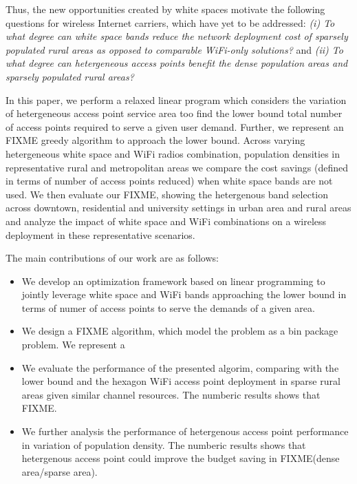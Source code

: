 Thus, the new opportunities created by white spaces motivate the following 
questions for wireless Internet carriers, which have yet to be addressed: 
{\it (i) To what degree can white space bands reduce the network deployment cost of
sparsely populated rural areas as opposed to comparable WiFi-only solutions?} and 
{\it (ii) To what degree can hetergeneous access points benefit the dense 
population areas and sparsely populated rural areas?}

In this paper, we perform a relaxed linear program which considers the 
variation of hetergeneous access point service area too find the lower bound
total number of access points required to serve a given user demand. Further,
we represent an FIXME greedy algorithm to approach the lower bound.  
Across varying hetergeneous white space and WiFi radios combination, population 
densities in representative rural and metropolitan areas we compare the 
cost savings (defined in terms of number of access points reduced) when 
white space bands are not used. We then evaluate our FIXME, showing
the hetergenous band selection across downtown, residential and university settings in
urban area and rural areas and analyze the impact of white space and WiFi
combinations on a wireless deployment in these representative scenarios.

The main contributions of our work are as follows:
\begin{itemize}
\item We develop an optimization framework based on linear programming to jointly leverage white space and WiFi 
bands approaching the lower bound in terms of numer of access points to serve the demands of a given area.
\item We design a FIXME algorithm, which model the problem as a bin package problem. We represent a 
\item We evaluate the performance of the presented algorim, comparing with the lower bound and the hexagon
WiFi access point deployment in sparse rural areas given similar channel resources. The numberic results shows that FIXME.  
\item We further analysis the performance of hetergenous access point performance in variation of population density. The
numberic results shows that hetergenous access point could improve the budget saving in FIXME(dense area/sparse area). 
\end{itemize}


